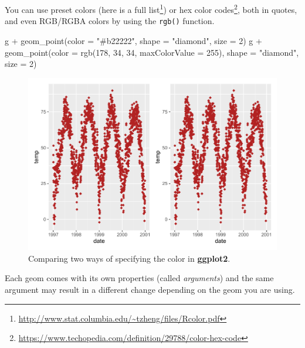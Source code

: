 \documentclass[
]{krantz}
\makeatletter
\newenvironment{Shaded}{\begin{snugshade}}{\end{snugshade}}
\newcommand{\AttributeTok}[1]{\textcolor[rgb]{0.61,0.61,0.61}{#1}}
\newcommand{\DecValTok}[1]{\textcolor[rgb]{0.06,0.06,0.06}{#1}}
\newcommand{\FunctionTok}[1]{\textcolor[rgb]{0,0,0}{#1}}
\newcommand{\NormalTok}[1]{#1}
\newcommand{\SpecialCharTok}[1]{\textcolor[rgb]{0,0,0}{#1}}
\newcommand{\StringTok}[1]{\textcolor[rgb]{0.5,0.5,0.5}{#1}}
\renewcommand{\href}[2]{#2\footnote{\url{#1}}}
\newenvironment{kframe}{%
\medskip{}
\setlength{\fboxsep}{.8em}
 \def\at@end@of@kframe{}%
 \ifinner\ifhmode%
  \def\at@end@of@kframe{\end{minipage}}%
  \begin{minipage}{\columnwidth}%
 \fi\fi%
 \def\FrameCommand##1{\hskip\@totalleftmargin \hskip-\fboxsep
 \colorbox{shadecolor}{##1}\hskip-\fboxsep
     \hskip-\linewidth \hskip-\@totalleftmargin \hskip\columnwidth}%
 \MakeFramed {\advance\hsize-\width
   \@totalleftmargin\z@ \linewidth\hsize
   \@setminipage}}%
 {\par\unskip\endMakeFramed%
 \at@end@of@kframe}
\renewenvironment{Shaded}{\begin{kframe}}{\end{kframe}}
\makeatother
\begin{document}
You can use preset colors (here is a \href{http://www.stat.columbia.edu/~tzheng/files/Rcolor.pdf}{full list}) or \href{https://www.techopedia.com/definition/29788/color-hex-code}{hex color codes}, both in quotes, and even RGB/RGBA colors by using the \texttt{rgb()} function.

\begin{Shaded}
\begin{Highlighting}[]
\NormalTok{g }\SpecialCharTok{+} \FunctionTok{geom\_point}\NormalTok{(}\AttributeTok{color =} \StringTok{"\#b22222"}\NormalTok{, }\AttributeTok{shape =} \StringTok{"diamond"}\NormalTok{, }\AttributeTok{size =} \DecValTok{2}\NormalTok{)}
\NormalTok{g }\SpecialCharTok{+} \FunctionTok{geom\_point}\NormalTok{(}\AttributeTok{color =} \FunctionTok{rgb}\NormalTok{(}\DecValTok{178}\NormalTok{, }\DecValTok{34}\NormalTok{, }\DecValTok{34}\NormalTok{, }\AttributeTok{maxColorValue =} \DecValTok{255}\NormalTok{), }\AttributeTok{shape =} \StringTok{"diamond"}\NormalTok{, }\AttributeTok{size =} \DecValTok{2}\NormalTok{)}
\end{Highlighting}
\end{Shaded}

\begin{figure}
\centering
\includegraphics{bookdown_files/figure-latex/ggplot-default-col-size-hex-rgb-plot-1.pdf}
\caption{\label{fig:ggplot-default-col-size-hex-rgb-plot}Comparing two ways of specifying the color in \textbf{ggplot2}.}
\end{figure}

Each geom comes with its own properties (called \emph{arguments}) and the same argument may result in a different change depending on the geom you are using.
\end{document}

